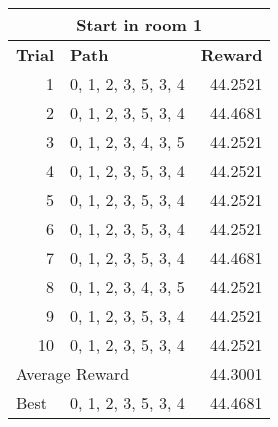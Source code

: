 \documentclass[../Head/Main.tex]{subfiles}
\begin{document}
\begin{tabular}{r l r}
	\hline
	\multicolumn{3}{c}{\textbf{\large Start in room 1}} \\
	\hline 
	\multicolumn{1}{l}{\textbf{Trial}} & \textbf{Path} & \textbf{Reward} \\ 			\hline
	1  & 0, 1, 2, 3, 5, 3, 4  & 44.2521\\
	2  & 0, 1, 2, 3, 5, 3, 4  & 44.4681\\
	3  & 0, 1, 2, 3, 4, 3, 5  & 44.2521\\
	4  & 0, 1, 2, 3, 5, 3, 4  & 44.2521\\
	5  & 0, 1, 2, 3, 5, 3, 4  & 44.2521\\
	6  & 0, 1, 2, 3, 5, 3, 4  & 44.2521\\
	7  & 0, 1, 2, 3, 5, 3, 4  & 44.4681\\
	8  & 0, 1, 2, 3, 4, 3, 5  & 44.2521\\
	9  & 0, 1, 2, 3, 5, 3, 4  & 44.2521\\
	10 & 0, 1, 2, 3, 5, 3, 4  & 44.2521\\
	\hline
	\multicolumn{2}{l}{Average Reward} & 44.3001 \\
	\hline	
	\multicolumn{1}{l}{Best} & 0, 1, 2, 3, 5, 3, 4  & 44.4681\\
	\hline
\end{tabular}
\end{document}
